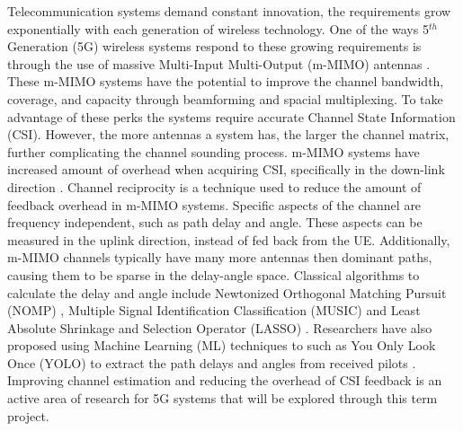 Telecommunication systems demand constant innovation, the requirements grow exponentially with each generation of wireless technology. One of the ways 5$^{th}$ Generation (5G) wireless systems respond to these growing requirements is through the use of massive Multi-Input Multi-Output (m-MIMO) antennas \cite{Dahlman2018}. These m-MIMO systems have the potential to improve the channel bandwidth, coverage, and capacity through beamforming and spacial multiplexing. To take advantage of these perks the systems require accurate Channel State Information (CSI). However, the more antennas a system has, the larger the channel matrix, further complicating the channel sounding process. m-MIMO systems have increased amount of overhead when acquiring CSI, specifically in the down-link direction \cite{Mawatwal2020}. Channel reciprocity is a technique used to reduce the amount of feedback overhead in m-MIMO systems. Specific aspects of the channel are frequency independent, such as path delay and angle. These aspects can be measured in the uplink direction, instead of fed back from the UE. Additionally,  m-MIMO channels typically have many more antennas then dominant paths, causing them to be sparse in the delay-angle space. Classical algorithms to calculate the delay and angle include  Newtonized Orthogonal Matching Pursuit (NOMP) \cite{Han2019}, Multiple Signal Identification Classification (MUSIC) \cite{Yin2016} and Least Absolute Shrinkage and Selection Operator (LASSO) \cite{liu2016}. Researchers have also proposed using Machine Learning (ML) techniques to such as You Only Look Once (YOLO) to extract the path delays and angles from received pilots \cite{Li2020}. Improving channel estimation and reducing the overhead of CSI feedback is an active area of research for 5G systems that will be explored through this term project.

